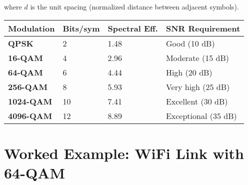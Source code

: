 where $d$ is the unit spacing (normalized distance between adjacent symbols).

{\def\LTcaptype{} %
\begin{longtable}[]{@{}llll@{}}
\toprule\noalign{}
Modulation & Bits/sym & Spectral Eff. & SNR Requirement \\
\midrule\noalign{}
\endhead
\bottomrule\noalign{}
\endlastfoot
\textbf{QPSK} & 2 & 1.48 & Good (10 dB) \\
\textbf{16-QAM} & 4 & 2.96 & Moderate (15 dB) \\
\textbf{64-QAM} & 6 & 4.44 & High (20 dB) \\
\textbf{256-QAM} & 8 & 5.93 & Very high (25 dB) \\
\textbf{1024-QAM} & 10 & 7.41 & Excellent (30 dB) \\
\textbf{4096-QAM} & 12 & 8.89 & Exceptional (35 dB) \\
\end{longtable}
}

\section{Worked Example: WiFi Link with 64-QAM}

